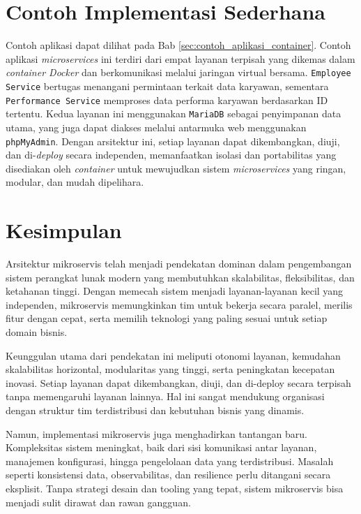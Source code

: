 \section{Contoh Implementasi Sederhana}
Contoh aplikasi dapat dilihat pada Bab \ref{sec:contoh_aplikasi_container}. Contoh aplikasi \textit{microservices} ini terdiri dari empat layanan terpisah yang dikemas dalam \textit{container Docker} dan berkomunikasi melalui jaringan virtual bersama. \texttt{Employee Service} bertugas menangani permintaan terkait data karyawan, sementara \texttt{Performance Service} memproses data performa karyawan berdasarkan ID tertentu. Kedua layanan ini menggunakan \texttt{MariaDB} sebagai penyimpanan data utama, yang juga dapat diakses melalui antarmuka web menggunakan \texttt{phpMyAdmin}. Dengan arsitektur ini, setiap layanan dapat dikembangkan, diuji, dan di-\textit{deploy} secara independen, memanfaatkan isolasi dan portabilitas yang disediakan oleh \textit{container} untuk mewujudkan sistem \textit{microservices} yang ringan, modular, dan mudah dipelihara.


\section{Kesimpulan}

Arsitektur mikroservis telah menjadi pendekatan dominan dalam pengembangan sistem perangkat lunak modern yang membutuhkan skalabilitas, fleksibilitas, dan ketahanan tinggi. Dengan memecah sistem menjadi layanan-layanan kecil yang independen, mikroservis memungkinkan tim untuk bekerja secara paralel, merilis fitur dengan cepat, serta memilih teknologi yang paling sesuai untuk setiap domain bisnis.

Keunggulan utama dari pendekatan ini meliputi otonomi layanan, kemudahan skalabilitas horizontal, modularitas yang tinggi, serta peningkatan kecepatan inovasi. Setiap layanan dapat dikembangkan, diuji, dan di-deploy secara terpisah tanpa memengaruhi layanan lainnya. Hal ini sangat mendukung organisasi dengan struktur tim terdistribusi dan kebutuhan bisnis yang dinamis.

Namun, implementasi mikroservis juga menghadirkan tantangan baru. Kompleksitas sistem meningkat, baik dari sisi komunikasi antar layanan, manajemen konfigurasi, hingga pengelolaan data yang terdistribusi. Masalah seperti konsistensi data, observabilitas, dan resilience perlu ditangani secara eksplisit. Tanpa strategi desain dan tooling yang tepat, sistem mikroservis bisa menjadi sulit dirawat dan rawan gangguan.

